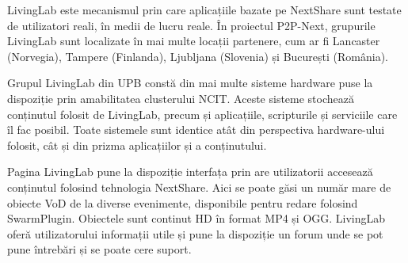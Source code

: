 LivingLab este mecanismul prin care aplicațiile bazate pe NextShare sunt
testate de utilizatori reali, în medii de lucru reale. În proiectul P2P-Next,
grupurile LivingLab sunt localizate în mai multe locații partenere, cum ar fi
Lancaster (Norvegia), Tampere (Finlanda), Ljubljana (Slovenia) și București
(România).


Grupul LivingLab din UPB constă din mai multe sisteme hardware puse la
dispoziție prin amabilitatea clusterului NCIT. Aceste sisteme stochează
conținutul folosit de LivingLab, precum și aplicațiile, scripturile și
serviciile care îl fac posibil. Toate sistemele sunt identice atât din
perspectiva hardware-ului folosit, cât și din prizma aplicațiilor și a
conținutului.

Pagina LivingLab pune la
dispoziție interfața prin are utilizatorii accesează conținutul folosind
tehnologia NextShare. Aici se poate găsi un număr mare de obiecte VoD de la
diverse evenimente, disponibile pentru redare folosind SwarmPlugin. Obiectele
sunt continut HD în format MP4 și OGG. LivingLab oferă utilizatorului informații
utile și pune la dispoziție un forum unde se pot pune întrebări și se poate
cere suport.

